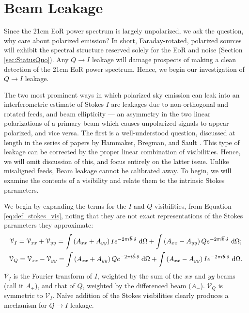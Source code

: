 \section{Beam Leakage}
\label{sec:BeamLeakage}

Since the 21cm EoR power spectrum is largely unpolarized, we ask the question, why care about
polarized emission? In short, Faraday-rotated, polarized sources will exhibit the spectral structure
reserved solely for the EoR and noise (Section \ref{sec:StatusQuo}). Any $Q\to I$ leakage will
damage prospects of making a clean detection of the 21cm EoR power spectrum. Hence, we begin our
investigation of $Q\to I$ leakage.

The two most prominent ways in which polarized sky emission can leak into an interferometric
estimate of Stokes $I$ are leakages due to non-orthogonal and rotated feeds, and beam ellipticity
--- an asymmetry in the two linear polarizations of a primary beam which causes unpolarized signals
to appear polarized, and vice versa. The first is a well-understood question, discussed at length in
the series of papers by Hammaker, Bregman, and Sault \cite{HBS1,HBS2,HBS3,HBS4,HBS5}. This type of
leakage can be corrected by the proper linear combination of visibilities. Hence, we will omit
discussion of this, and focus entirely on the latter issue. Unlike misaligned feeds, Beam leakage 
cannot be calibrated away. To begin, we will examine the contents of a visibility and relate them 
to the intrinsic Stokes parameters.

We begin by expanding the terms for the $I$ and $Q$ visibilities, from Equation
\ref{eq:def_stokes_vis}, noting that they are not exact representations of the Stokes parameters
they approximate:
\begin{gather}
  \mathcal{V}_{I} = \mathcal{V}_{xx} + \mathcal{V}_{yy} 
    = \int \left(A_{xx} + A_{yy}\right)Ie^{-2\pi i \vec{b}\cdot\hat{s}}\ \mathrm{d}\Omega
    + \int \left(A_{xx} - A_{yy}\right)Qe^{-2\pi i \vec{b}\cdot\hat{s}}\ \mathrm{d}\Omega;
  \\
  \mathcal{V}_{Q} = \mathcal{V}_{xx} - \mathcal{V}_{yy} 
    = \int \left(A_{xx} + A_{yy}\right)Qe^{-2\pi i \vec{b}\cdot\hat{s}}\ \mathrm{d}\Omega
    + \int \left(A_{xx} - A_{yy}\right)Ie^{-2\pi i \vec{b}\cdot\hat{s}}\ \mathrm{d}\Omega.
\end{gather}
$\mathcal{V}_I$ is the Fourier transform of $I$, weighted by the sum of the $xx$ and $yy$ beams
(call it $A_+$), and that of $Q$, weighted by the differenced beam ($A_-$). $\mathcal{V}_Q$ is
symmetric to $\mathcal{V}_I$. Na\"{i}ve addition of the Stokes visibilities clearly produces a
mechanism for $Q\to I$ leakage.

